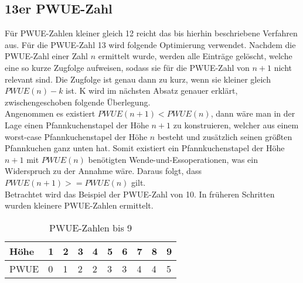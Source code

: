 \subsection{13er PWUE-Zahl}\label{subsec:13er-pwue-zahl}
Für PWUE-Zahlen kleiner gleich 12 reicht das bis hierhin beschriebene Verfahren aus.
Für die PWUE-Zahl 13 wird folgende Optimierung verwendet.
Nachdem die PWUE-Zahl einer Zahl $n$ ermittelt wurde, werden alle Einträge gelöscht, welche eine so kurze Zugfolge
aufweisen, sodass sie für die PWUE-Zahl von $n + 1$ nicht relevant sind.
Die Zugfolge ist genau dann zu kurz, wenn sie kleiner gleich $PWUE(n) - k$ ist.
K wird im nächsten Absatz genauer erklärt, zwischengeschoben folgende Überlegung. \\
Angenommen es existiert $PWUE(n + 1) < PWUE(n)$, dann wäre man in der Lage einen Pfannkuchenstapel der
Höhe $n + 1$ zu konstruieren, welcher aus einem worst-case Pfannkuchenstapel der Höhe $n$ besteht
und zusätzlich seinen grö{\ss}ten Pfannkuchen ganz unten hat.
Somit existiert ein Pfannkuchenstapel der Höhe $n + 1$ mit $PWUE(n)$ benötigten Wende-und-Essoperationen, was ein
Widerspruch zu der Annahme wäre.
Daraus folgt, dass $PWUE(n + 1) >= PWUE(n)$ gilt. \\
Betrachtet wird das Beispiel der PWUE-Zahl von 10.
In früheren Schritten wurden kleinere PWUE-Zahlen ermittelt.
\begin{table}[h]
    \centering
    \begin{tabular}{|l|l|l|l|l|l|l|l|l|l|}
        \hline
        Höhe & 1 & 2 & 3 & 4 & 5 & 6 & 7 & 8 & 9 \\ \hline
        PWUE & 0 & 1 & 2 & 2 & 3 & 3 & 4 & 4 & 5 \\ \hline
    \end{tabular}
    \caption{PWUE-Zahlen bis 9}
    \label{tab:pwue-bis-9}
\end{table}

